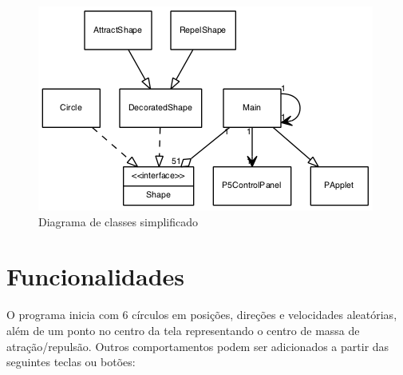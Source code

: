 \documentclass[12pt]{article}
\begin{document}
\begin{figure}[h!]
	\centering
	\includegraphics[width=.8\textwidth]{umlsimple.png}
	\caption{Diagrama de classes simplificado}
	\label{uml}
\end{figure}

\section{Funcionalidades}
\label{funcionalidades}
\vspace{0.4 true cm}

O programa inicia com 6 círculos em posições, direções e velocidades aleatórias, além de um ponto no centro da tela representando o centro de 
massa de atração/repulsão. Outros comportamentos podem ser adicionados a partir das seguintes teclas ou botões:
\end{document}
